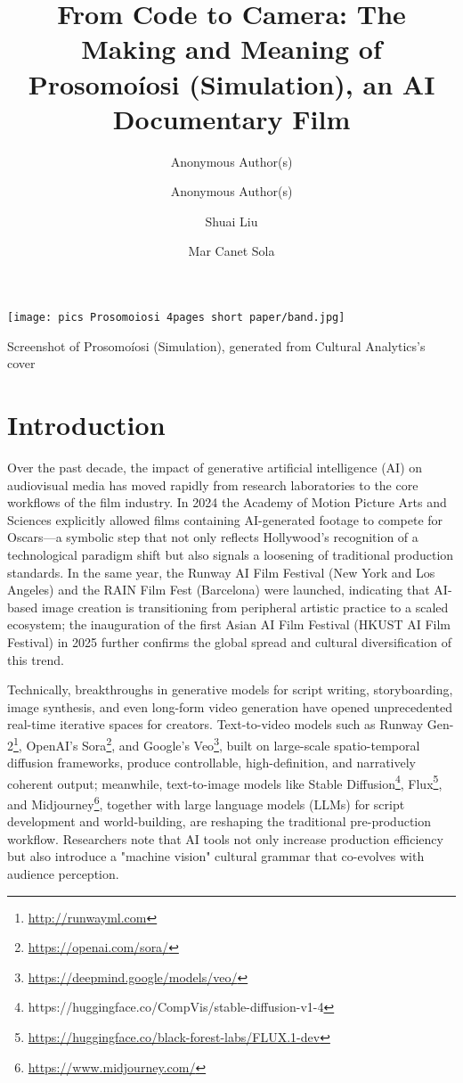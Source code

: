 \documentclass[sigconf,nonacm]{acmart}
\author{Anonymous Author(s)}
\title{From Code to Camera: The Making and Meaning of Prosomoíosi (Simulation), an AI Documentary Film}
\author{Anonymous Author(s)}
\affiliation{%
    \institution{Anonymous Institution}
    \city{Anonymous City}
    \country{Anonymous Country}
  }
\author{Shuai Liu}
\affiliation{%
  \institution{Academy of Media Arts Cologne (KHM)}
  \city{Cologne}
  \country{Germany}}
\author{Mar Canet Sola}
\affiliation{%
  \institution{BFM, Tallinn University, Estonia}
  \city{}
  \country{}}
\affiliation{%
  \institution{Academy of Media Art Cologne(KHM), Germany}
  \city{}
  \country{}}
\begin{document}
\begin{teaserfigure}
    \centering
    \texttt{[image: pics Prosomoiosi 4pages short paper/band.jpg]}
    \caption{Screenshot of Prosomoíosi (Simulation), generated from Cultural Analytics's cover\cite{manovich_cultural_analytics_2020}}
    \label{fig:enter-label}
\end{teaserfigure}


\maketitle

\section{Introduction}

Over the past decade, the impact of generative artificial intelligence (AI) on audiovisual media has moved rapidly from research laboratories to the core workflows of the film industry. In 2024 the Academy of Motion Picture Arts and Sciences explicitly allowed films containing AI-generated footage to compete for Oscars—a symbolic step that not only reflects Hollywood's recognition of a technological paradigm shift but also signals a loosening of traditional production standards. In the same year, the Runway AI Film Festival (New York and Los Angeles) and the RAIN Film Fest (Barcelona) were launched, indicating that AI-based image creation is transitioning from peripheral artistic practice to a scaled ecosystem; the inauguration of the first Asian AI Film Festival (HKUST AI Film Festival) in 2025 further confirms the global spread and cultural diversification of this trend.

Technically, breakthroughs in generative models for script writing, storyboarding, image synthesis, and even long-form video generation have opened unprecedented real-time iterative spaces for creators. Text-to-video models such as Runway Gen-2\footnote{\url{http://runwayml.com}}, OpenAI's Sora\footnote{\url{https://openai.com/sora/}}, and Google's Veo\footnote{\url{https://deepmind.google/models/veo/}}, built on large-scale spatio-temporal diffusion frameworks, produce controllable, high-definition, and narratively coherent output; meanwhile, text-to-image models like Stable Diffusion\footnote{https://huggingface.co/CompVis/stable-diffusion-v1-4}, Flux\footnote{\url{https://huggingface.co/black-forest-labs/FLUX.1-dev}}, and Midjourney\footnote{\url{https://www.midjourney.com/}}, together with large language models (LLMs) for script development and world-building, are reshaping the traditional pre-production workflow. Researchers note that AI tools not only increase production efficiency but also introduce a "machine vision" cultural grammar that co-evolves with audience perception.
\end{document}
